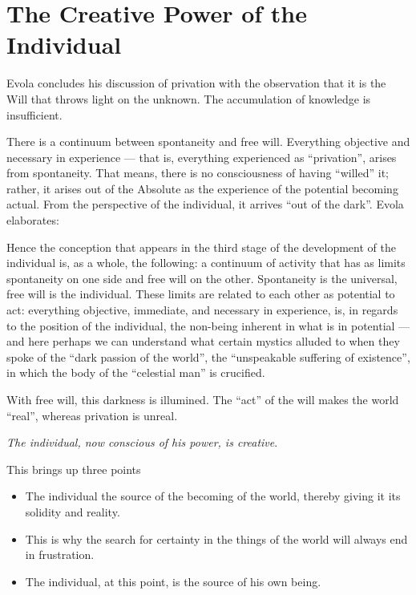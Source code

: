 \section{The Creative Power of the Individual}

Evola concludes his discussion of privation with the observation that it is the Will that throws light on the unknown. The accumulation of knowledge is insufficient.

There is a continuum between spontaneity and free will. Everything objective and necessary in experience --- that is, everything experienced as ``privation'', arises from spontaneity. That means, there is no consciousness of having ``willed'' it; rather, it arises out of the Absolute as the experience of the potential becoming actual. From the perspective of the individual, it arrives ``out of the dark''. Evola elaborates:

\begin{quotex}
Hence the conception that appears in the third stage of the development of the individual is, as a whole, the following: a continuum of activity that has as limits spontaneity on one side and free will on the other. Spontaneity is the universal, free will is the individual. These limits are related to each other as potential to act: everything objective, immediate, and necessary in experience, is, in regards to the position of the individual, the non-being inherent in what is in potential --- and here perhaps we can understand what certain mystics alluded to when they spoke of the ``dark passion of the world'', the ``unspeakable suffering of existence'', in which the body of the ``celestial man'' is crucified.
\end{quotex}


With free will, this darkness is illumined. The ``act'' of the will makes the world ``real'', whereas privation is unreal.

\emph{The individual, now conscious of his power, is creative}.


This brings up three points

\begin{itemize}


\item The individual the source of the becoming of the world, thereby giving it its solidity and reality.

\item This is why the search for certainty in the things of the world will always end in frustration.

\item The individual, at this point, is the source of his own being.
\end{itemize}


